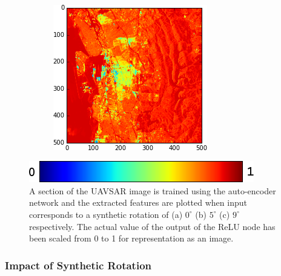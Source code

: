 \begin{figure}[!htb]
\begin{subfigure}[t]{0.31\columnwidth}
		\caption{}
		\label{fig:5deg}
	\end{subfigure}   
	~ 
	\begin{subfigure}[t]{0.31\columnwidth}
		\includegraphics[width = \columnwidth]{Figures/Rotation_FS/9deg_decode3_11}
		\caption{}
		\label{fig:9deg}
	\end{subfigure}  
	
	
	\includegraphics[width = 0.3\columnwidth]{Figures/Rotation_FS/JET}
	\caption[Effect of Rotation]{A section of the UAVSAR image is trained using the auto-encoder network and the extracted features are plotted when input corresponds to a synthetic rotation of (a)  $0^\circ$ (b) $5^\circ$  (c) $9^\circ$ respectively. The actual value of the output of the ReLU node has been scaled from 0 to 1 for representation as an image.  }
	\label{fig:rotCompare}
\end{figure} 



\subsubsection{Impact of Synthetic Rotation}
\label{sec:EXPT1}

